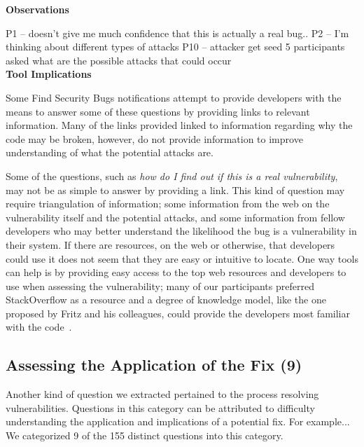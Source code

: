 \documentclass[conference]{IEEEtran}
\begin{document}
\noindent\textbf{Observations}

P1 -- doesn't give me much confidence that this is actually a real bug..
P2 -- I'm thinking about different types of attacks 
P10 -- attacker get seed
5 participants asked what are the possible attacks that could occur
\\

\noindent\textbf{Tool Implications}

Some Find Security Bugs notifications attempt to provide developers with the means to answer some of these questions by providing links to relevant information. 
Many of the links provided linked to information regarding why the code may be broken, however, do not provide information to improve understanding of what the potential attacks are.  

Some of the questions, such as \textit{how do I find out if this is a real vulnerability}, may not be as simple to answer by providing a link. 
This kind of question may require triangulation of information; some information from the web on the vulnerability itself and the potential attacks, and some information from fellow developers who may better understand the likelihood the bug is a vulnerability in their system. 
If there are resources, on the web or otherwise, that developers could use it does not seem that they are easy or intuitive to locate. 
One way tools can help is by providing easy access to the top web resources and developers to use when assessing the vulnerability; many of our participants preferred StackOverflow as a resource and a degree of knowledge model, like the one proposed by Fritz and his colleagues, could provide the developers most familiar with the code~\cite{fritz2010degree}.



\noindent\subsection{\textbf{Assessing the Application of the Fix (9)}}\label{aaf}

Another kind of question we extracted pertained to the process resolving vulnerabilities. 
Questions in this category can be attributed to difficulty understanding the application and implications of a potential fix.
For example...
We categorized 9 of the 155 distinct questions into this category.
\\
\end{document}
